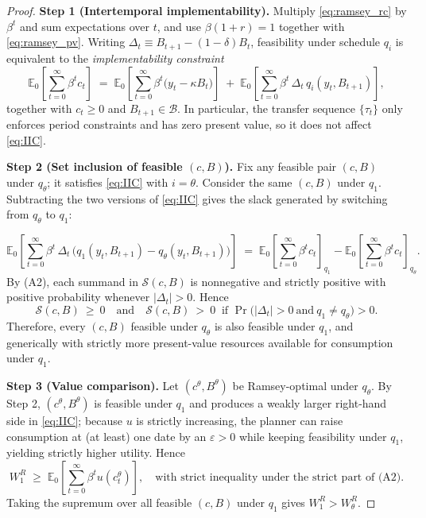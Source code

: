 \documentclass[12pt]{article}
\theoremstyle{plain}
\newcommand{\E}{\mathbb{E}}
\begin{document}
\begin{proof}
	\textbf{Step 1 (Intertemporal implementability).}
	Multiply \eqref{eq:ramsey_rc} by $\beta^t$ and sum expectations over $t$, and use
	$\beta(1+r)=1$ together with \eqref{eq:ramsey_pv}. Writing
	$\Delta_t\equiv B_{t+1}-(1-\delta)B_t$, feasibility under schedule $q_i$ is
	equivalent to the \emph{implementability constraint}
	\begin{equation}
		\label{eq:IIC}
		\E_0\!\left[\sum_{t=0}^\infty \beta^t c_t\right]
		\;=\;
		\E_0\!\left[\sum_{t=0}^\infty \beta^t\bigl(y_t-\kappa B_t\bigr)\right]
		\;+\;
		\E_0\!\left[\sum_{t=0}^\infty \beta^t\,\Delta_t\,q_i(y_t,B_{t+1})\right],
	\end{equation}
	together with $c_t\ge0$ and $B_{t+1}\in\mathcal B$. In particular, the transfer
	sequence $\{\tau_t\}$ only enforces period constraints and has zero present value,
	so it does not affect \eqref{eq:IIC}.

	\smallskip
	\textbf{Step 2 (Set inclusion of feasible $(c,B)$).}
	Fix any feasible pair $(c,B)$ under $q_\theta$; it satisfies \eqref{eq:IIC} with $i=\theta$.
	Consider the same $(c,B)$ under $q_1$. Subtracting the two versions of
	\eqref{eq:IIC} gives the slack generated by switching from $q_\theta$ to $q_1$:

	\begin{equation}
		\label{eq:slack}
		{\E_0\!\left[\sum_{t=0}^\infty \beta^t\,\Delta_t\,
		\bigl(q_1(y_t,B_{t+1})-q_\theta(y_t,B_{t+1})\bigr)\right]}
		\;=\;
		\E_0\!\left[\sum_{t=0}^\infty \beta^t c_t\right]_{\!q_1}
		-
		\E_0\!\left[\sum_{t=0}^\infty \beta^t c_t\right]_{\!q_\theta}.
	\end{equation}
	By (A2), each summand in $\mathcal S(c,B)$ is nonnegative and strictly positive
	with positive probability whenever $|\Delta_t|>0$. Hence
	\[
		\mathcal S(c,B)\ \ge\ 0 \quad\text{and}\quad \mathcal S(c,B)\ >\ 0
		\ \text{ if } \Pr\!\bigl(|\Delta_t|>0\ \text{and}\ q_1\ne q_\theta\bigr)>0.
	\]
	Therefore, every $(c,B)$ feasible under $q_\theta$ is also feasible under
	$q_1$, and generically with strictly more present-value resources available for
	consumption under $q_1$.

	\smallskip
	\textbf{Step 3 (Value comparison).}
	Let $(c^\theta,B^\theta)$ be Ramsey-optimal under $q_\theta$.
	By Step 2, $(c^\theta,B^\theta)$ is feasible under $q_1$ and produces a weakly
	larger right-hand side in \eqref{eq:IIC}; because $u$ is strictly increasing,
	the planner can raise consumption at (at least) one date by an $\varepsilon>0$ while
	keeping feasibility under $q_1$, yielding strictly higher utility. Hence
	\[
		W^R_1 \;\ge\; \E_0\!\left[\sum_{t=0}^\infty \beta^t u(c^\theta_t)\right],
		\quad\text{with strict inequality under the strict part of (A2).}
	\]
	Taking the supremum over all feasible $(c,B)$ under $q_1$ gives
	$W^R_1>W^R_\theta$.


\end{proof}
\end{document}

